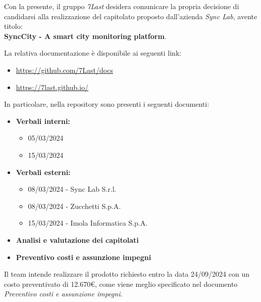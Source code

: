 \documentclass[italian,12pt]{article} %
\begin{document}


\newpage



\vspace{11pt}

Con la presente, il gruppo \textit{7Last} desidera comunicare la propria decisione di candidarsi alla realizzazione
del capitolato proposto dall'azienda \textit{Sync Lab}, avente titolo: \\ \textbf{SyncCity - A smart city monitoring 
platform}.

\vspace{10pt}

La relativa documentazione è disponibile ai seguenti link:
\begin{itemize}
    	\item\textcolor{blue}{\url{https://github.com/7Last/docs}}
		\item\textcolor{blue}{\url{https://7last.github.io/}}
\end{itemize}

\vspace{10pt}

In particolare, nella repository sono presenti i seguenti documenti:
\begin{itemize}
	\item{\textbf{Verbali interni:}}
		\begin{itemize}
			\item{05/03/2024}
			\item{15/03/2024}
		\end{itemize}

	\item{\textbf{Verbali esterni:}}
		\begin{itemize}
			\item{08/03/2024 - Sync Lab S.r.l.}
			\item{08/03/2024 - Zucchetti S.p.A.}
			\item{15/03/2024 - Imola Informatica S.p.A.}
		\end{itemize}
	
	\item{\textbf{Analisi e valutazione dei capitolati}}
	\item{\textbf{Preventivo costi e assunzione impegni}}
\end{itemize}

\vspace{10pt}

Il team intende realizzare il prodotto richiesto entro la data 24/09/2024 con un costo preventivato di 12.670€,
come viene meglio specificato nel documento \textit{Preventivo costi e assunzione impegni}.
\end{document}
